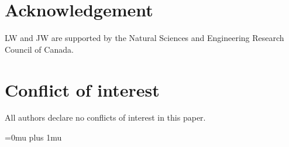\documentclass{CMHPhD-SIVD}
\begin{document}

\section*{Acknowledgement}
LW and JW are supported by the Natural Sciences and Engineering Research Council of Canada.
\section*{Conflict of interest}
All authors declare no conflicts of interest in this paper.

%
\begingroup
\Urlmuskip=0mu plus 1mu\relax
\def\UrlBreaks{\do\/\do-/\do.}
\printbibliography
\endgroup
\end{document}
